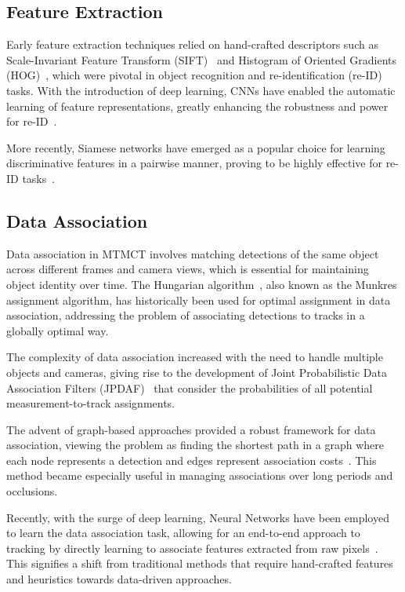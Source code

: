 \subsection{Feature Extraction}\label{subsec:milestone:eature_extraction}
Early feature extraction techniques relied on hand-crafted descriptors such as Scale-Invariant Feature Transform (SIFT)~\cite{Lowe04} and Histogram of Oriented Gradients (HOG)~\cite{Dalal05}, which were pivotal in object recognition and re-identification (re-ID) tasks. With the introduction of deep learning, CNNs have enabled the automatic learning of feature representations, greatly enhancing the robustness and power for re-ID~\cite{Krizhevsky12, He16}.

More recently, Siamese networks have emerged as a popular choice for learning discriminative features in a pairwise manner, proving to be highly effective for re-ID tasks~\cite{Varior16}.

\subsection{Data Association}\label{subsec:milestone_data_association}
Data association in MTMCT involves matching detections of the same object across different frames and camera views, which is essential for maintaining object identity over time. The Hungarian algorithm~\cite{Kuhn55}, also known as the Munkres assignment algorithm, has historically been used for optimal assignment in data association, addressing the problem of associating detections to tracks in a globally optimal way.

The complexity of data association increased with the need to handle multiple objects and cameras, giving rise to the development of Joint Probabilistic Data Association Filters (JPDAF)~\cite{Fortmann83} that consider the probabilities of all potential measurement-to-track assignments.

The advent of graph-based approaches provided a robust framework for data association, viewing the problem as finding the shortest path in a graph where each node represents a detection and edges represent association costs~\cite{Zhang08}. This method became especially useful in managing associations over long periods and occlusions.

Recently, with the surge of deep learning, Neural Networks have been employed to learn the data association task, allowing for an end-to-end approach to tracking by directly learning to associate features extracted from raw pixels~\cite{Milan16b}. This signifies a shift from traditional methods that require hand-crafted features and heuristics towards data-driven approaches.

